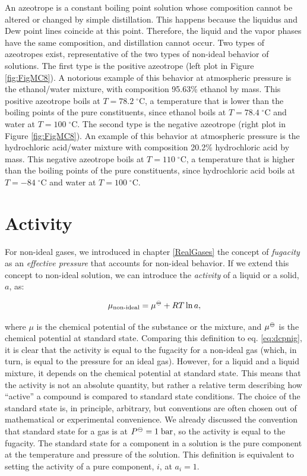 \documentclass[
  9pt,
]{extbook}
\theoremstyle{definition}
\theoremstyle{definition}
\theoremstyle{definition}
\theoremstyle{definition}
\theoremstyle{remark}
\begin{document}
An azeotrope is a constant boiling point solution whose composition cannot be altered or changed by simple distillation. This happens because the liquidus and Dew point lines coincide at this point. Therefore, the liquid and the vapor phases have the same composition, and distillation cannot occur. Two types of azeotropes exist, representative of the two types of non-ideal behavior of solutions. The first type is the positive azeotrope (left plot in Figure \ref{fig:FigMC8}). A notorious example of this behavior at atmospheric pressure is the ethanol/water mixture, with composition 95.63\% ethanol by mass. This positive azeotrope boils at \(T=78.2\;^\circ \text{C}\), a temperature that is lower than the boiling points of the pure constituents, since ethanol boils at \(T=78.4\;^\circ \text{C}\) and water at \(T=100\;^\circ \text{C}\). The second type is the negative azeotrope (right plot in Figure \ref{fig:FigMC8}). An example of this behavior at atmospheric pressure is the hydrochloric acid/water mixture with composition 20.2\% hydrochloric acid by mass. This negative azeotrope boils at \(T=110\;^\circ \text{C}\), a temperature that is higher than the boiling points of the pure constituents, since hydrochloric acid boils at \(T=-84\;^\circ \text{C}\) and water at \(T=100\;^\circ \text{C}\).

\section{Activity}\label{activity}

For non-ideal gases, we introduced in chapter \ref{RealGases} the concept of \emph{fugacity} as an \emph{effective pressure} that accounts for non-ideal behavior. If we extend this concept to non-ideal solution, we can introduce the \emph{activity} of a liquid or a solid, \(a\), as:

\begin{equation}
\mu_{\text{non-ideal}} = \mu^{{-\kern-6pt{\ominus}\kern-6pt-}} + RT \ln a,
\label{eq:act1}
\end{equation}

where \(\mu\) is the chemical potential of the substance or the mixture, and \(\mu^{{-\kern-6pt{\ominus}\kern-6pt-}}\) is the chemical potential at standard state. Comparing this definition to eq. \eqref{eq:dcpnig}, it is clear that the activity is equal to the fugacity for a non-ideal gas (which, in turn, is equal to the pressure for an ideal gas). However, for a liquid and a liquid mixture, it depends on the chemical potential at standard state. This means that the activity is not an absolute quantity, but rather a relative term describing how ``active'' a compound is compared to standard state conditions. The choice of the standard state is, in principle, arbitrary, but conventions are often chosen out of mathematical or experimental convenience. We already discussed the convention that standard state for a gas is at \(P^{{-\kern-6pt{\ominus}\kern-6pt-}}=1\;\text{bar}\), so the activity is equal to the fugacity. The standard state for a component in a solution is the pure component at the temperature and pressure of the solution. This definition is equivalent to setting the activity of a pure component, \(i\), at \(a_i=1\).
\end{document}
